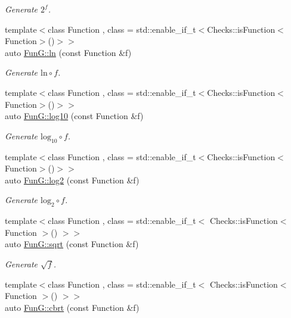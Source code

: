 \begin{DoxyCompactItemize}
\begin{DoxyCompactList}\small\item\em Generate $2^f$. \end{DoxyCompactList}\item 
{\footnotesize template$<$class Function , class  = std\+::enable\+\_\+if\+\_\+t$<$\+Checks\+::is\+Function$<$\+Function$>$()$>$$>$ }\\auto \hyperlink{group__CMathGroup_ga31313571b08f65b853643e14fc8fc714}{Fun\+G\+::ln} (const Function \&f)
\begin{DoxyCompactList}\small\item\em Generate $ \mathrm{ln}\circ f $. \end{DoxyCompactList}\item 
{\footnotesize template$<$class Function , class  = std\+::enable\+\_\+if\+\_\+t$<$\+Checks\+::is\+Function$<$\+Function$>$()$>$$>$ }\\auto \hyperlink{group__CMathGroup_gae9506f4e0e6fad4f756f636044697bfe}{Fun\+G\+::log10} (const Function \&f)
\begin{DoxyCompactList}\small\item\em Generate $ \mathrm{log}_{10}\circ f $. \end{DoxyCompactList}\item 
{\footnotesize template$<$class Function , class  = std\+::enable\+\_\+if\+\_\+t$<$\+Checks\+::is\+Function$<$\+Function$>$()$>$$>$ }\\auto \hyperlink{group__CMathGroup_gacd6be7e9de7bbd54c852f0acf0c7d2c2}{Fun\+G\+::log2} (const Function \&f)
\begin{DoxyCompactList}\small\item\em Generate $ \mathrm{log}_{2}\circ f $. \end{DoxyCompactList}\item 
{\footnotesize template$<$class Function , class  = std\+::enable\+\_\+if\+\_\+t$<$ Checks\+::is\+Function$<$ Function $>$() $>$$>$ }\\auto \hyperlink{group__CMathGroup_ga136c890475e48f88469a737d95368d05}{Fun\+G\+::sqrt} (const Function \&f)
\begin{DoxyCompactList}\small\item\em Generate $ \sqrt{f} $. \end{DoxyCompactList}\item 
{\footnotesize template$<$class Function , class  = std\+::enable\+\_\+if\+\_\+t$<$ Checks\+::is\+Function$<$ Function $>$() $>$$>$ }\\auto \hyperlink{group__CMathGroup_gaa7f2552adfb8ec41aeb685adddd8bf98}{Fun\+G\+::cbrt} (const Function \&f)

\end{DoxyCompactItemize}
